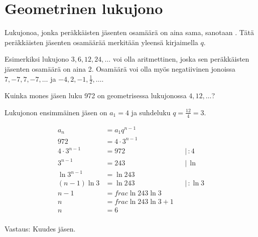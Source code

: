 \section{Geometrinen lukujono}

Lukujonoa, jonka peräkkäisten jäsenten osamäärä on aina sama, sanotaan . Tätä peräkkäisten jäsenten osamäärää merkitään yleensä kirjaimella $q$.



Esimerkiksi lukujono $3, 6, 12, 24, \ldots$ voi olla aritmettinen, joska sen peräkkäisten jäsenten osamäärä on aina 2. Osamäärä voi olla myös negatiivinen jonoissa  $7, -7, 7, -7, \ldots$ ja  $ -4, 2, -1, \frac{1}{2}, \ldots$.

\begin{esimerkki}

Kuinka mones jäsen luku 972 on geometrisessa lukujonossa $4, 12,  \ldots$?

Lukujonon ensimmäinen jäsen on $a_1=4$ ja suhdeluku $q=\frac{12}{4}=3$.

\begin{align*}
	a_n &= a_1q^{n-1}  \\
	972 &= 4 \cdot 3^{n-1}  \\
	4 \cdot 3^{n-1} &= 972 & & | \, :4 \\
	3^{n-1} &= 243 & & | \, \ln\\
	\ln 3^{n-1} &= \ln 243 \\
	(n-1)\ln 3 &= \ln 243  & & | \, : \ln 3 \\
	n-1 &= frac{\ln 243}{\ln 3} \\
	n &= frac{\ln 243}{\ln 3} +1\\
	n &= 6\\
\end{align*}

Vastaus: Kuudes jäsen.

\end{esimerkki}
